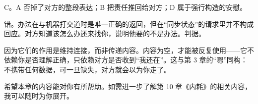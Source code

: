\begin{answerssec}
\item C。A 否掉了对方的整段表达；B 把责任推回给对方；D 属于强行构造的安慰。

\item 错。办法在与机器打交道时是唯一正确的返回，但在“同步状态”的请求里并不构成回应。对方知道该怎么办还来找你，说明他要的不是办法。判据。

\item 因为它们的作用是维持连接，而非传递内容。内容为空，才能被反复使用——它不依赖你是否理解正确，只依赖对方是否收到“我还在”。这与第 3 章的“嗯”同构：不携带任何数据，可一旦缺失，对方就会以为你走了。
\end{answerssec}

\hcirule

\begin{qabox}
\end{qabox}

\hcirule

希望本章的内容能对你有所帮助。如需进一步了解第 10 章《内耗》的相关内容，我可以随时为你展开。

